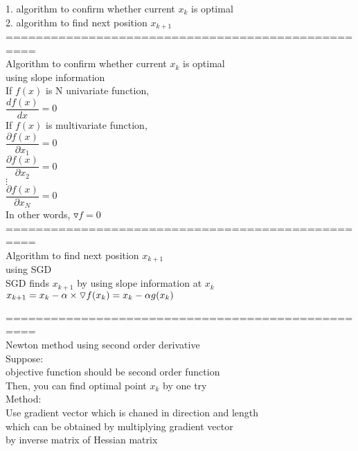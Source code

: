\documentclass{article}
\begin{document}
1. algorithm to confirm whether current $x_k$ is optimal \\ 
2. algorithm to find next position $x_{k+1}$ \\ 

==================================================\\
Algorithm to confirm whether current $x_k$ is optimal \\ 
using slope information \\ 

If $f(x)$ is N univariate function, \\ 
$\dfrac{df(x)}{dx}=0$ \\ 

If $f(x)$ is multivariate function, \\ 
$\dfrac{\partial f(x)}{\partial x_1}=0$ \\ 
$\dfrac{\partial f(x)}{\partial x_2}=0$ \\ 
$\vdots$ \\ 
$\dfrac{\partial f(x)}{\partial x_N}=0$ \\ 

In other words, $\triangledown f=0$ \\

==================================================\\
Algorithm to find next position $x_{k+1}$ \\ 
using SGD \\ 

SGD finds $x_{k+1}$ by using slope information at $x_k$ \\ 

$x_{k+1} \\\\ 
=x_k - \alpha \times \triangledown f(x_k) \\\\ 
=x_k - \alpha g(x_k)$

==================================================\\
Newton method using second order derivative \\ 

Suppose: \\ 
objective function should be second order function \\ 
Then, you can find optimal point $x_k$ by one try \\ 

Method: \\ 
Use gradient vector which is chaned in direction and length \\ 
which can be obtained by multiplying gradient vector \\
by inverse matrix of Hessian matrix \\ 
\end{document}
